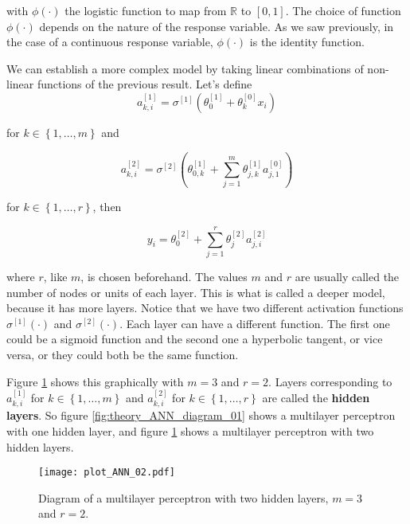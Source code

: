with $\phi(\cdot)$ the logistic function to map from $\mathbb{R}$ to $\left[ 0, 1 \right]$. The choice of function $\phi(\cdot)$ depends on the nature of the response variable. As we saw previously, in the case of a continuous response variable, $\phi(\cdot)$ is the identity function.

We can establish a more complex model by taking linear combinations of non-linear functions of the previous result. Let's define
$$
a_{k,i}^{[1]} = \sigma^{[1]} \left( \theta_{0}^{[1]} + \theta_k^{[0]} x_i \right)
$$

for $k \in \left\{ 1, \ldots, m \right\}$ and

$$
  a_{k,i}^{[2]} = \sigma^{[2]} \left(  \theta_{0,k}^{[1]} + \sum_{j = 1}^m \theta_{j,k}^{[1]} a_{j,1}^{[0]}  \right)
$$


for $k \in \left\{ 1, \ldots, r \right\}$, then

$$
  y_i = \theta_0^{[2]} + \sum_{j = 1}^r \theta_j^{[2]} a_{j,i}^{[2]}
$$

where $r$, like $m$, is chosen beforehand. The values $m$ and $r$ are usually called the number of nodes or units of each layer. This is what is called a deeper model, because it has more layers. Notice that we have two different activation functions $\sigma^{[1]}(\cdot)$ and $\sigma^{[2]}(\cdot)$. Each layer can have a different function. The first one could be a sigmoid function and the second one a hyperbolic tangent, or vice versa, or they could both be the same function.

Figure \ref{fig:theory_ANN_diagram_02} shows this graphically with $m = 3$ and $r = 2$. Layers corresponding to $a_{k,i}^{[1]}$ for $k \in \left\{ 1, \ldots, m \right\}$ and $a_{k,i}^{[2]}$ for $k \in \left\{ 1, \ldots, r \right\}$ are called the \textbf{hidden layers}. So figure \ref{fig:theory_ANN_diagram_01} shows a multilayer perceptron with one hidden layer, and figure \ref{fig:theory_ANN_diagram_02} shows a multilayer perceptron with two hidden layers.


\begin{figure}[H]
    \centering
    \texttt{[image: plot\_ANN\_02.pdf]}
    \caption{Diagram of a multilayer perceptron with two hidden layers, $m = 3$ and $r = 2$.}
    \label{fig:theory_ANN_diagram_02}
\end{figure}

